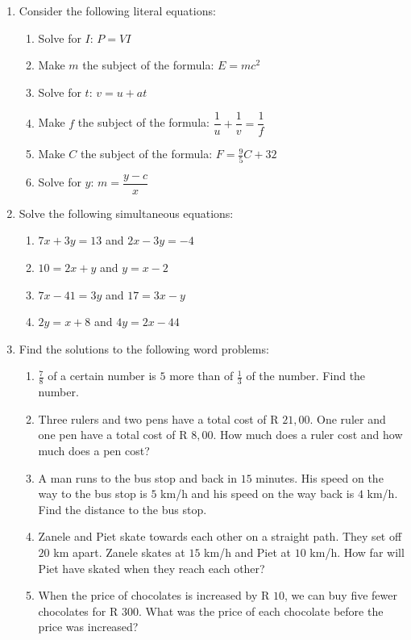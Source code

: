 \begin{eocexercises}{}
\begin{enumerate}[itemsep=5pt, label=\textbf{\arabic*}. ]
\item Consider the following literal equations:
\begin{multicols}{2}
\begin{enumerate}[itemsep=4pt,label=\textbf{(\alph*)}]
\item Solve for $I$: $P = VI$
\item Make $m$ the subject of the formula: $E=mc^{2}$
\item Solve for $t$: $v = u + at$
\item Make $f$ the subject of the formula: $\dfrac{1}{u} + \dfrac{1}{v} = \dfrac{1}{f}$
\item Make $C$ the subject of the formula: $F=\frac{9}{5}C + 32$
\item Solve for $y$: $m = \dfrac{y-c}{x}$
\end{enumerate}
\end{multicols}
\item Solve the following simultaneous equations:
\begin{multicols}{2}
\begin{enumerate}[itemsep=2pt,label=\textbf{(\alph*)}]
\item $7x+3y=13$ and $2x-3y=-4$  
\item $10=2x+y$ and $y=x-2$
\item $7x-41=3y$ and $17=3x-y$
\item $2y=x+8$ and $4y=2x-44$
\end{enumerate}
\end{multicols}
\item Find the solutions to the following word problems:
\begin{enumerate}[itemsep=2pt,label=\textbf{(\alph*)}]
\item $\frac{7}{8}$ of a certain number is $5$ more than of $\frac{1}{3}$ of the number. Find the number.
\item Three rulers and two pens have a total cost of R $21,00$. One ruler and one pen have a total cost of R $8,00$. How much does a ruler cost and how much does a pen cost? 
\item A man runs to the bus stop and back in $15$ minutes. His speed on the way to the bus stop is $5$ km/h and his speed on the way back is $4$ km/h. Find the distance to the bus stop.
\item Zanele and Piet skate towards each other on a straight path. They set off $20$ km apart. Zanele skates at $15$ km/h and Piet at $10$ km/h. How far will Piet have skated when they reach each other?
\item When the price of chocolates is increased by R $10$, we can buy five fewer chocolates for R $300$. What was the price of each chocolate before the price was increased?
\end{enumerate}
\end{enumerate}

\end{eocexercises}


